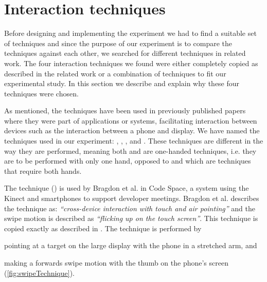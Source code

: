\section{Interaction techniques} \label{sec:techniques}
Before designing and implementing the experiment we had to find a suitable set of techniques and since the purpose of our experiment is to compare the techniques against each other, we searched for different techniques in related work.
The four interaction techniques we found were either completely copied as described in the related work or a combination of techniques to fit our experimental study.
In this section we describe and explain why these four techniques were chosen.

As mentioned, the techniques have been used in previously published papers where they were part of applications or systems, facilitating interaction between devices such as the interaction between a phone and display. 
We have named the techniques used in our experiment: \swipe, \tilt, \throw, and \pinch.
These techniques are different in the way they are performed, meaning both \swipe and \tilt are one-handed techniques, i.e. they are to be performed with only one hand, opposed to \throw and \pinch which are techniques that require both hands.


The \swipe technique () is used by Bragdon et al. \cite{Bragdon:2011} in Code Space, a system using the Kinect and smartphones to support developer meetings. 
Bragdon et al. describes the technique as: \emph{``cross-device interaction with touch and air pointing''} and the swipe motion is described as \emph{``flicking up on the touch screen''}. 
This technique is copied exactly as described in \cite{Bragdon:2011}.
The \swipe technique is performed by 
\begin{enumerate*}[label=\itshape\roman*\upshape)]
	\item{pointing at a target on the large display with the phone in a stretched arm, and}
	\item{making a forwards swipe motion with the thumb on the phone's screen (\cref{fig:swipeTechnique}).}
\end{enumerate*}

